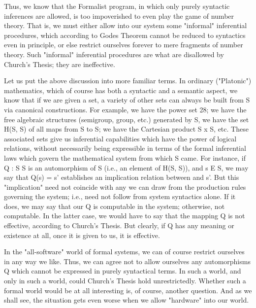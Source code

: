 \documentclass[a4paper,12pt]{article}
\begin{document}
Thus, we know that the Formalist program,
in which only purely syntactic inferences are allowed, is too impoverished to even play the game of number theory.
That is, we must either allow into our system some "informal" inferential procedures, which according to Godes Theorem
cannot be reduced to syntactics even in principle, or else restrict ourselves forever to mere fragments of number theory.
Such "informal" inferential procedures are what are disallowed by Church's Thesis; they are ineffective.

Let us put the above discussion into more familiar terms. In ordinary
("Platonic") mathematics, which of course has both a syntactic and a semantic aspect,
we know that if we are given a set, a variety of other sets
can always be built from S via canonical constructions. For example, we
have the power set 28; we have the free algebraic structures (semigroup,
group, etc.)  generated by S, we have the set H(S, S) of all maps from
S to S; we have the Cartesian product S x S, etc. These associated sets
give us inferential capabilities which have the power of logical relations,
without necessarily being expressible in terms of the formal inferential laws
which govern the mathematical system from which S came. For instance,
if Q : S 	S is an automorphism of S (i.e., an element of H(S, S)), and
s E S, we may say that Q(s) = s' establishes an implication relation between and s'.
But this "implication" need not coincide with any we can draw
from the production rules governing the system; i.e., need not follow from
system syntactics alone. If it does, we may say that our Q is computable in
the system; otherwise, not computable. In the latter case, we would have to
say that the mapping Q is not effective, according to Church's Thesis. But
clearly, if Q has any meaning or existence at all, once it is given to us, it is
effective.

In the "all-software" world of formal systems, we can of course restrict ourselves in any way we like.
Thus, we can agree not to allow ourselves any automorphisms Q which cannot be expressed in purely syntactical
terms. In such a world, and only in such a world, could Church's Thesis hold unrestrictedly.
Whether such a formal world would be at all interesting is, of course, another question.
And as we shall see, the situation gets even worse when we allow "hardware" into our world.
\end{document}
